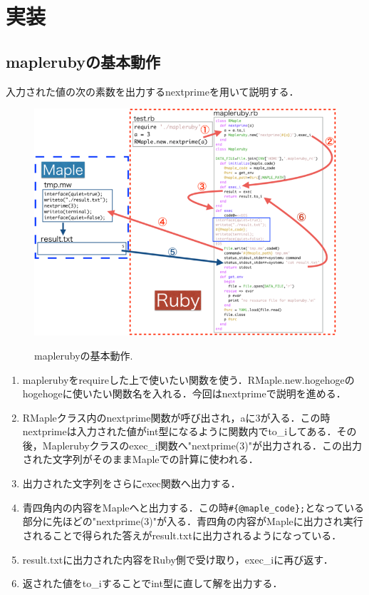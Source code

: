 \documentclass[10pt,a4j]{article}
\begin{document}
\section{実装}
\subsection{maplerubyの基本動作}
入力された値の次の素数を出力するnextprimeを用いて説明する．

\begin{figure}[htbp]\begin{center}
\includegraphics[width=12cm,bb= 0 0 937 753]{../figs/./mapleruby_eringi.003.png}
\caption{maplerubyの基本動作.}
\label{figure:one}
\label{default}\end{center}\end{figure}
\begin{enumerate}
\item maplerubyをrequireした上で使いたい関数を使う．RMaple.new.hogehogeのhogehogeに使いたい関数名を入れる．今回はnextprimeで説明を進める．
\item RMapleクラス内のnextprime関数が呼び出され，aに3が入る．この時nextprimeは入力された値がint型になるように関数内でto\_iしてある．その後，Maplerubyクラスのexec\_i関数へ"nextprime(3)"が出力される．この出力された文字列がそのままMapleでの計算に使われる．
\item 出力された文字列をさらにexec関数へ出力する．
\item 青四角内の内容をMapleへと出力する．この時\verb|#{@maple_code};|となっている部分に先ほどの"nextprime(3)"が入る．青四角の内容がMapleに出力され実行されることで得られた答えがresult.txtに出力されるようになっている．
\item result.txtに出力された内容をRuby側で受け取り，exec\_iに再び返す．
\item 返された値をto\_iすることでint型に直して解を出力する．
\end{enumerate}
\end{document}
